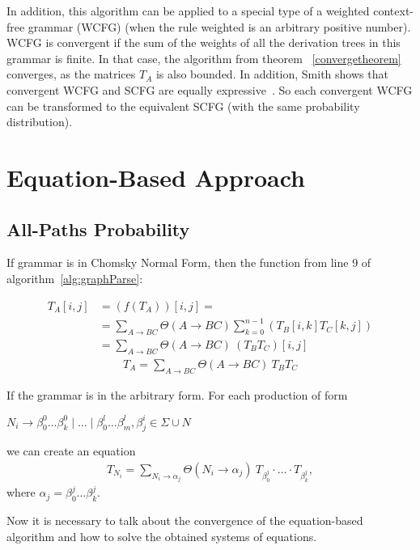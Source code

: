 \documentclass[sigconf, 10pt]{acmart}
\begin{document}
In addition, this algorithm can be applied to a special type of a weighted context-free grammar (WCFG) (when the rule weighted is an arbitrary positive number). WCFG is convergent if the sum of the weights of all the derivation trees in this grammar is finite. In that case, the algorithm from theorem ~\ref{convergetheorem} converges, as the matrices $T_A$ is also bounded. In addition, Smith shows that convergent WCFG and SCFG are equally expressive~\cite{smith2007weighted}. So each convergent WCFG can be transformed to the equivalent SCFG (with the same probability distribution). 

\section{Equation-Based Approach}

\subsection{All-Paths Probability}

If grammar is in Chomsky Normal Form, then the function from line 9 of algorithm~\ref{alg:graphParse}:

\begin{align}
    T_A[i,j] &= (f(T_A))[i,j] = \\
             &= \sum_{A \to BC} \Theta(A \to BC) \sum_{k=0}^{n-1} (T_B[i,k]T_C[k,j]) \nonumber \\
             &= \sum_{A \to BC} \Theta(A \to BC) \ (T_BT_C)[i, j] \nonumber
\end{align}
\begin{align}
    T_A  = \sum_{A \to BC} \Theta(A \to BC) \ T_BT_C
\end{align}

If the grammar is in the arbitrary form. For each production of form 
\begin{center}
$N_i \to \beta^0_0 \dots \beta^0_k \mid \ldots \mid \beta^l_0 \dots \beta^l_m, \beta^i_j \in \Sigma \cup N$ 
\end{center}
we can create an equation 
\begin{align}
T_{N_i} = \sum_{N_i \to \alpha_j} \Theta(N_i \to \alpha_j) \ T_{\beta^j_0}\cdot \ldots \cdot T_{\beta^j_k},
\end{align}
where $\alpha_j = \beta^j_0 \dots \beta^j_k$.

Now it is necessary to talk about the convergence of the equation-based algorithm and how to solve the obtained systems of equations. 
\end{document}
